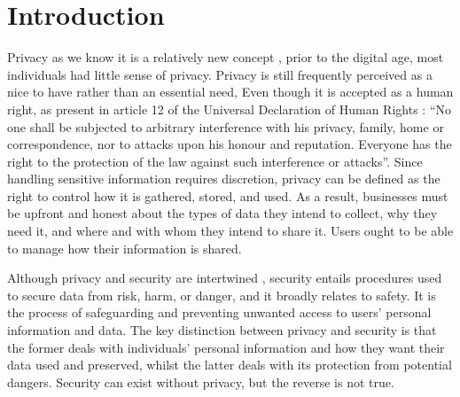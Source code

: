 \documentclass[manuscript,screen,review,natbib=false]{acmart}
\begin{document}

\maketitle




\section{Introduction}

Privacy as we know it is a relatively new concept \cite{vincent2016privacy, moore2017privacy},
prior to the digital age, most individuals had little sense of privacy.
Privacy is still frequently perceived as a nice to have rather than an essential
need, Even though it is accepted as a human right, as present
in article 12 of the Universal Declaration of Human Rights \cite{RooseveltUniversal}:
``No one shall be subjected to arbitrary interference with his privacy,
family, home or correspondence, nor to attacks upon his honour and reputation.
Everyone has the right to the protection of the law against such interference
or attacks''. Since handling sensitive information requires discretion, privacy
can be defined \cite{InternationalWhat, SpiekermannEngineering}
as the right to control how it is gathered, stored, and used. As a result,
businesses must be upfront and honest about the types of data they intend to
collect, why they need it, and where and with whom they intend to share it.
Users ought to be able to manage how their information is shared.

Although privacy and security are intertwined \cite{HIVDifference}, security entails procedures
used to secure data from risk, harm, or danger, and it broadly relates to
safety. It is the process of safeguarding and preventing unwanted access to
users' personal information and data. The key distinction between privacy and
security is that the former deals with individuals' personal information and how
they want their data used and preserved, whilst the latter deals with its protection
from potential dangers. Security can exist without privacy, but the reverse is
not true.
\end{document}
